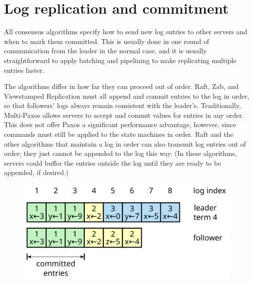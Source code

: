 \section{Log replication and commitment}
\label{related:logreplication}

All consensus algorithms specify how to send new log entries to other
servers and when to mark them committed. This is usually done in one
round of communication from the leader in the normal case, and it is
usually straightforward to apply batching and pipelining to make
replicating multiple entries faster.

The algorithms differ in how far they can proceed out of order. Raft,
Zab, and Viewstamped Replication must all append and commit entries to
the log in order, so that followers' logs always remain consistent with
the leader's. Traditionally, Multi-Paxos allows servers to accept and
commit values for entries in any order. This does not offer Paxos a
significant performance advantage, however, since commands must still be
applied to the state machines in order. Raft and the other algorithms
that maintain a log in order can also transmit log entries out of
order; they just cannot be appended to the log this way. (In these
algorithms, servers could buffer the entries outside the log until they
are ready to be appended, if desired.)

\begin{figure}
\centering
\includegraphics[scale=.50]{related/rereplicate}
\label{fig:related:rereplicate}
\end{figure}

